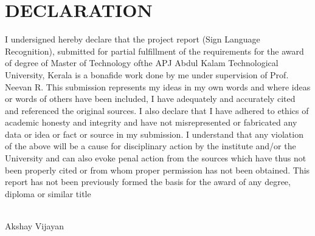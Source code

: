 \chapter*{\rm \large \bf DECLARATION}
\vspace{4.0mm}
\setlength{\parindent}{4em}
I undersigned hereby declare that the project report
(Sign Language Recognition), submitted for partial
fulfillment of the requirements for the award of degree of Master of Technology
ofthe APJ Abdul Kalam Technological University, Kerala is a bonafide work done
by me under supervision of Prof. Neevan R. This submission represents my
ideas in my own words and where ideas or words of others have been included, I
have adequately and accurately cited and referenced the original sources. I also
declare that I have adhered to ethics of academic honesty and integrity and have
not misrepresented or fabricated any data or idea or fact or source in my
submission. I understand that any violation of the above will be a cause for
disciplinary action by the institute and/or the University and can also evoke
penal action from the sources which have thus not been properly cited or from
whom proper permission has not been obtained. This report has not been
previously formed the basis for the award of any degree, diploma or similar
title

\vspace{0.3 cm}

\\
\hfill {Akshay Vijayan}\\

\newpage 
